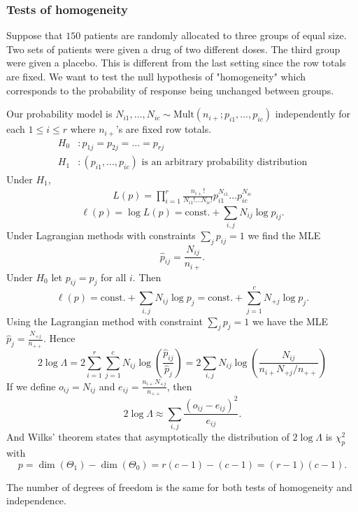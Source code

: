 \documentclass{article}
\begin{document}
\subsubsection{Tests of homogeneity}
\begin{example}
  Suppose that $ 150 $ patients are randomly allocated to three groups of equal size. Two sets of patients were given a drug of two different doses. The third group were given a placebo. This is different from the last setting since the row totals are fixed. We want to test the null hypothesis of "homogeneity" which corresponds to the probability of response being unchanged between groups.\par
  Our probability model is $ N_{i1},\dots, N_{ic}\sim \text{Mult}(n_{i+}; p_{i1},\dots, p_{ic}) $ independently for each $ 1\le i \le r $ where $ n_{i+} $'s are fixed row totals.
  \begin{align*}
	  H_0 &: p_{1j} = p_{2j} = \dots = p_{rj} \\
	  H_1 &: (p_{i1},\dots, p_{ic}) \text{ is an arbitrary probability distribution}
  \end{align*}
  Under $ H_1 $,
  \begin{align*}
  L(p) = \prod_{i=1}^r \frac{n_{i+}!}{N_{i1}!\dots N_{ic}!}p_{i1}^{N_{i1}}\dots p_{ic}^{N_{ic}}
  \end{align*}
  \[
	  \ell(p) = \log L(p) = \text{const.} + \sum_{i,j} N_{ij}\log p_{ij}.
  \]
  Under Lagrangian methods with constraints $ \sum_j p_{ij} = 1 $ we find the MLE
  \[
	  \hat p_{ij} = \frac{N_{ij}}{n_{i+}}.
  \]
  Under $ H_0 $ let $ p_{ij} = p_j $ for all $ i $. Then
  \[
	  \ell(p) = \text{const.} + \sum_{i,j} N_{ij}\log p_j= \text{const.} + \sum_{j=1}^c N_{+j} \log p_j.
  \]
  Using the Lagrangian method with constraint $ \sum_j p_j = 1 $ we have the MLE $ \hat p_j = \frac{N_{+j}}{n_{++}} $. Hence
  \[
	  2\log\Lambda = 2\sum_{i=1}^r \sum_{j=1}^c N_{ij} \log\left(\frac{\hat p_{ij}}{\hat p_j}\right) = 2\sum_{i,j} N_{ij} \log\left(\frac{N_{ij}}{n_{i+}N_{+j}/n_{++}}\right)
  \]
If we define $ o_{ij} = N_{ij} $ and $ e_{ij} = \frac{n_{i+}N_{+j}}{n_{++}} $, then
\[
	2\log\Lambda \approx \sum_{i,j}\frac{(o_{ij}-e_{ij})^2}{e_{ij}}.
\]
And Wilks' theorem states that asymptotically the distribution of $ 2\log\Lambda $ is $ \chi^2_p $ with 
\[
  p = \dim(\Theta_1) - \dim(\Theta_0) = r(c-1) - (c-1) = (r-1)(c-1).
\]
\begin{remark}
  The number of degrees of freedom is the same for both tests of homogeneity and independence.
\end{remark}
\end{example}
\end{document}

